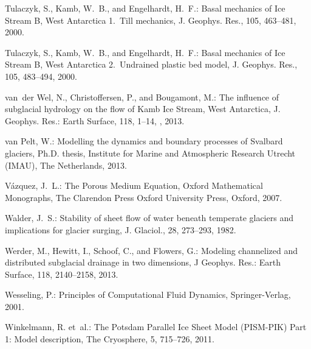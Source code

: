 \documentclass[gmd]{copernicus}   %
\begin{document}
\begin{thebibliography}{67}
Tulaczyk, S., Kamb, W.~B., and Engelhardt, H.~F.: Basal mechanics of {I}ce
  {S}tream {B}, {W}est {A}ntarctica 1.~{T}ill mechanics, J. Geophys. Res., 105,
  463--481, 2000{}.

Tulaczyk, S., Kamb, W.~B., and Engelhardt, H.~F.: Basal mechanics of {I}ce
  {S}tream {B}, {W}est {A}ntarctica 2.~{U}ndrained plastic bed model, J.
  Geophys. Res., 105, 483--494, 2000{}.

van~der Wel, N., Christoffersen, P., and Bougamont, M.: The influence of
  subglacial hydrology on the flow of {K}amb {I}ce {S}tream, {W}est
  {A}ntarctica, J. Geophys. Res.: Earth Surface, 118, 1--14,
  , 2013.

van Pelt, W.: Modelling the dynamics and boundary processes of {S}valbard
  glaciers, Ph.D. thesis, Institute for Marine and Atmospheric Research Utrecht
  (IMAU), The Netherlands, 2013.

V{\'a}zquez, J.~L.: The {P}orous {M}edium {E}quation, Oxford Mathematical
  Monographs, The Clarendon Press Oxford University Press, Oxford, 2007.

Walder, J.~S.: Stability of sheet flow of water beneath temperate glaciers and
  implications for glacier surging, J. Glaciol., 28, 273--293, 1982.

Werder, M., Hewitt, I., Schoof, C., and Flowers, G.: Modeling channelized and
  distributed subglacial drainage in two dimensions, J Geophys. Res.: Earth
  Surface, 118, 2140--2158, 2013.

Wesseling, P.: Principles of {C}omputational {F}luid {D}ynamics,
  Springer-Verlag, 2001.

Winkelmann, R. et~al.: The {P}otsdam {P}arallel {I}ce {S}heet
  {M}odel ({PISM-PIK}) {P}art 1: {M}odel description, The Cryosphere, 5,
  715--726, 2011.
\end{thebibliography}


\appendix
\end{document}
